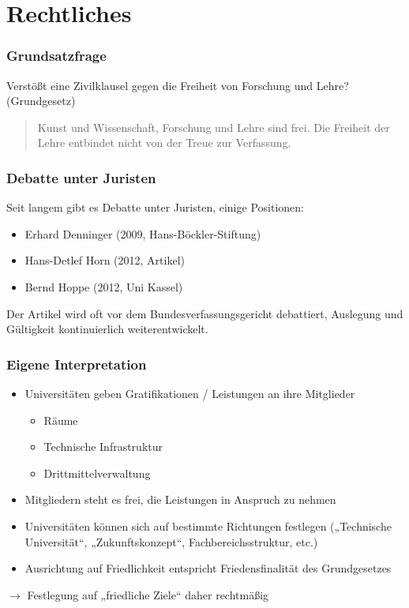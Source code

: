 \documentclass[presentation]{beamer}
\begin{document}
\section{Rechtliches}
\label{sec-6}
\begin{frame}
\frametitle{Grundsatzfrage}
\label{sec-6-1}

Verstößt eine Zivilklausel gegen die Freiheit von Forschung und Lehre? (Grundgesetz)
\begin{quote} %
\label{sec-6-1-1}

    Kunst und Wissenschaft, Forschung und Lehre sind frei. Die Freiheit der Lehre entbindet nicht von der Treue zur Verfassung.
\vskip1mm \hspace*{}
\end{quote}
\end{frame}
\begin{frame}
\frametitle{Debatte unter Juristen}
\label{sec-6-2}

   Seit langem gibt es Debatte unter Juristen, einige Positionen:
\begin{itemize}
\item Erhard Denninger (2009, Hans-Böckler-Stiftung)
\item Hans-Detlef Horn (2012, Artikel)
\item Bernd Hoppe (2012, Uni Kassel)
\end{itemize}
   \vspace{0.5cm}
   Der Artikel wird oft vor dem Bundesverfassungsgericht debattiert, Auslegung und Gültigkeit kontinuierlich weiterentwickelt.
\end{frame}
\begin{frame}
\frametitle{Eigene Interpretation}
\label{sec-6-3}


\begin{itemize}
\item Universitäten geben Gratifikationen / Leistungen an ihre Mitglieder
\begin{itemize}
\item Räume
\item Technische Infrastruktur
\item Drittmittelverwaltung
\end{itemize}
\item Mitgliedern steht es frei, die Leistungen in Anspruch zu nehmen
\item Universitäten können sich auf bestimmte Richtungen festlegen („Technische Universität“, „Zukunftskonzept“, Fachbereichsstruktur, etc.)
\item Ausrichtung auf Friedlichkeit entspricht Friedensfinalität des Grundgesetzes
\end{itemize}
     
   \(\rightarrow\) Festlegung auf „friedliche Ziele“ daher rechtmäßig
\end{frame}
\end{document}
